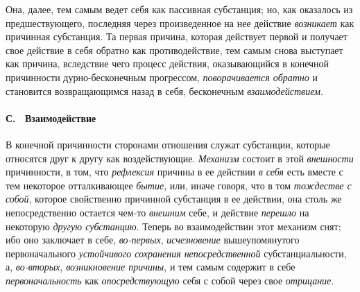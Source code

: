 Она, далее, тем самым ведет себя как пассивная субстанция; но, как оказалось
из предшествующего, последняя через произведенное на нее действие
{\em возникает} как причинная субстанция. Та первая
причина, которая действует первой и получает свое действие в себя обратно
как противодействие, тем самым снова выступает как причина, вследствие чего
процесс действия, оказывающийся в конечной причинности дурно-бесконечным
прогрессом, {\em поворачивается обратно} и становится
возвращающимся назад в себя, бесконечным
{\em взаимодействием}.

\paragraph[С. \ Взаимодействие]{С. \ Взаимодействие}
В конечной причинности сторонами отношения
служат субстанции, которые относятся друг к другу как воздействующие.
{\em Механизм} состоит в этой
{\em внешности} причинности, в том, что
{\em рефлексия} причины в ее действии
{\em в себя} есть вместе с тем некоторое отталкивающее
{\em бытие}, или, иначе говоря, что в том
{\em тождестве с собой}, которое свойственно причинной
субстанция в ее действии, она столь же непосредственно остается чем-то
{\em внешним} себе, и действие
{\em перешло} на некоторую
{\em другую субстанцию}. Теперь во взаимодействии этот
механизм снят; ибо оно заключает в себе,
{\em во-первых}, {\em исчезновение}
вышеупомянутого первоначального {\em устойчивого
сохранения непосредственной} субстанциальности, а,
{\em во-вторых}, {\em возникновение
причины}, и тем самым содержит в себе
{\em первоначальность} как
{\em опосредствующую} себя с собой через свое
{\em отрицание}.

